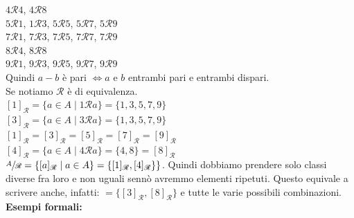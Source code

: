 \documentclass[12pt, letterpaper]{report}
\begin{document}
		$4\mathscr{R}4$, $4\mathscr{R}8$ \\
		$5\mathscr{R}1$, $1\mathscr{R}3$, $5\mathscr{R}5$, $5\mathscr{R}7$, $5\mathscr{R}9$ \\
		$7\mathscr{R}1$, $7\mathscr{R}3$, $7\mathscr{R}5$, $7\mathscr{R}7$, $7\mathscr{R}9$ \\
		$8\mathscr{R}4$, $8\mathscr{R}8$ \\
		$9\mathscr{R}1$, $9\mathscr{R}3$, $9\mathscr{R}5$, $9\mathscr{R}7$, $9\mathscr{R}9$ \\
		Quindi $a - b$ è pari $\iff a$ e $b$ entrambi pari e entrambi dispari. \\
		Se notiamo $\mathscr{R}$ è di equivalenza. \\
		$[1]_\mathscr{R} = \{a \in A \mid 1 \mathscr{R} a\} = \{1,3,5,7,9\}$ \\
		$[3]_\mathscr{R} = \{a \in A \mid 3 \mathscr{R} a\} = \{1,3,5,7,9\}$ \\
		$[1]_\mathscr{R} = [3]_\mathscr{R} = [5]_\mathscr{R} = [7]_\mathscr{R} = [9]_\mathscr{R}$ \\
		$[4]_\mathscr{R} = \{a \in A \mid 4 \mathscr{R} a\} = \{4, 8\} = [8]_\mathscr{R}$ \\
		$\sfrac{A}{\mathscr{R}} = \{[a]_\mathscr{R} \mid a \in A\} = \{[1]_\mathscr{R}, [4]_\mathscr{R}\}\}$. Quindi dobbiamo prendere solo classi diverse fra loro e non uguali sennò avremmo elementi ripetuti. Questo equivale a scrivere anche, infatti: $=\{[3]_\mathscr{R}, [8]_\mathscr{R}\}$ e tutte le varie possibili combinazioni. \\
		\textbf{\color{red}Esempi formali:}
\end{document}

